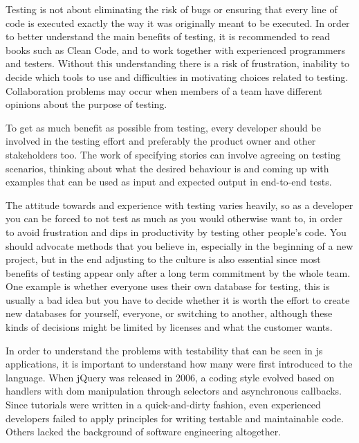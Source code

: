 \documentclass[11pt]{article}
\begin{document}
Testing is not about eliminating the risk of bugs or ensuring that every line of code is executed exactly the way it was originally meant to be executed. In order to better understand the main benefits of testing, it is recommended to read books such as Clean Code\cite{Clean}, and to work together with experienced programmers and testers. Without this understanding there is a risk of frustration, inability to decide which tools to use and difficulties in motivating choices related to testing. Collaboration problems may occur when members of a team have different opinions about the purpose of testing. \cite[question~38]{Edelstam}

To get as much benefit as possible from testing, every developer should be involved in the testing effort and preferably the product owner and other stakeholders too. The work of specifying stories can involve agreeing on testing scenarios, thinking about what the desired behaviour is and coming up with examples that can be used as input and expected output in end-to-end tests. \cite[questions~39-40]{Edelstam}\cite[question~30]{Stenmark}

The attitude towards and experience with testing varies heavily, so as a developer you can be forced to not test as much as you would otherwise want to, in order to avoid frustration and dips in productivity by testing other people's code. You should advocate methods that you believe in, especially in the beginning of a new project, but in the end adjusting to the culture is also essential since most benefits of testing appear only after a long term commitment by the whole team. One example is whether everyone uses their own database for testing, this is usually a bad idea but you have to decide whether it is worth the effort to create new databases for yourself, everyone, or switching to another, although these kinds of decisions might be limited by licenses and what the customer wants. \cite[questions~31-32]{Stenmark}\cite[question~36]{Ahnve}

In order to understand the problems with testability that can be seen in \gls{js} applications, it is important to understand how many were first introduced to the language. When jQuery was released in 2006, a coding style evolved based on handlers with \gls{dom} manipulation through selectors and asynchronous callbacks. Since tutorials were written in a quick-and-dirty fashion, even experienced developers failed to apply principles for writing testable and maintainable code. Others lacked the background of software engineering altogether. \cite[question~10]{Stenmark}
\end{document}
